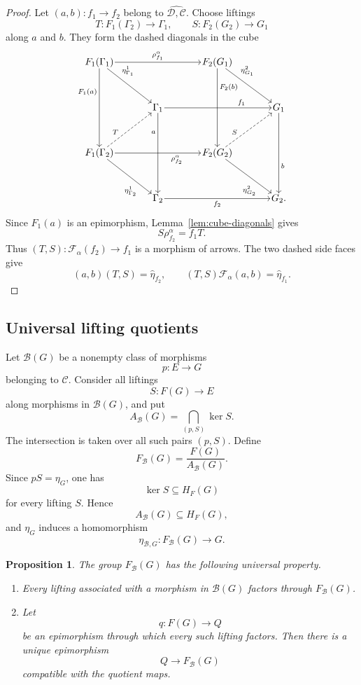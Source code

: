 \documentclass[10pt]{amsart}
\newtheorem{proposition}[theorem]{Proposition}
\renewcommand{\*}{\cdot {\dots} \cdot}
\newcommand{\?}[1]{\overset{?}{#1}}
\numberwithin{equation}{section}
\begin{document}
\begin{proof}
Let $(a,b)\colon f_1\to f_2$ belong to
$\widehat{\mathcal D,\mathcal C}$. Choose liftings
\[
T\colon F_1(\Gamma_2)\longrightarrow\Gamma_1,
\qquad
S\colon F_2(G_2)\longrightarrow G_1
\]
along $a$ and $b$. They form the dashed diagonals in the cube
\[
\begin{tikzcd}[
  row sep=3.5em,
  column sep=3.8em,
  cells={nodes={inner sep=1pt}}
]
F_1(\Gamma_1)
  \arrow[rr,"\rho_{f_1}^\alpha"]
  \arrow[dd,"F_1(a)"' {pos=0.30}]
  \arrow[dr,"\eta^1_{\Gamma_1}" {pos=0.28}]
&&
F_2(G_1)
  \arrow[dd,"F_2(b)" {pos=0.24}]
  \arrow[dr,"\eta^2_{G_1}" {pos=0.28}]
&
\\
&
\Gamma_1
  \arrow[rr,"f_1" {pos=0.72}]
  \arrow[dd,"a"' {pos=0.24}]
&&
G_1
  \arrow[dd,"b" {pos=0.66}]
\\
F_1(\Gamma_2)
  \arrow[rr,"\rho_{f_2}^\alpha"' {pos=0.72}]
  \arrow[dr,"\eta^1_{\Gamma_2}"' {pos=0.72}]
  \arrow[ur,dashed,"T" {pos=0.30}]
&&
F_2(G_2)
  \arrow[dr,"\eta^2_{G_2}"' {pos=0.72}]
  \arrow[ur,dashed,"S" {pos=0.30}]
&
\\
&
\Gamma_2
  \arrow[rr,"f_2"']
&&
G_2 .
\end{tikzcd}
\]
Since $F_1(a)$ is an epimorphism,
Lemma~\ref{lem:cube-diagonals} gives
\[
S\rho_{f_2}^\alpha=f_1T.
\]
Thus $(T,S)\colon\mathscr F_\alpha(f_2)\to f_1$ is a morphism of
arrows. The two dashed side faces give
\[
(a,b)(T,S)=\widehat\eta_{f_2},
\qquad
(T,S)\mathscr F_\alpha(a,b)=\widehat\eta_{f_1}.
\]
\end{proof}

\subsection{Universal lifting quotients}

Let $\mathcal B(G)$ be a nonempty class of morphisms
\[
p\colon E\longrightarrow G
\]
belonging to $\mathcal C$. Consider all liftings
\[
S\colon F(G)\longrightarrow E
\]
along morphisms in $\mathcal B(G)$, and put
\[
A_{\mathcal B}(G)=\bigcap_{(p,S)}\ker S.
\]
The intersection is taken over all such pairs $(p,S)$. Define
\[
F_{\mathcal B}(G)=\frac{F(G)}{A_{\mathcal B}(G)}.
\]
Since $pS=\eta_G$, one has
\[
\ker S\subseteq H_F(G)
\]
for every lifting $S$. Hence
\[
A_{\mathcal B}(G)\subseteq H_F(G),
\]
and $\eta_G$ induces a homomorphism
\[
\eta_{\mathcal B,G}\colon F_{\mathcal B}(G)\longrightarrow G.
\]

\begin{proposition}\label{prop:universal-lifting-quotient}
The group $F_{\mathcal B}(G)$ has the following universal
property.
\begin{enumerate}
\item Every lifting associated with a morphism in
$\mathcal B(G)$ factors through $F_{\mathcal B}(G)$.

\item Let
\[
q\colon F(G)\longrightarrow Q
\]
be an epimorphism through which every such lifting factors. Then
there is a unique epimorphism
\[
Q\longrightarrow F_{\mathcal B}(G)
\]
compatible with the quotient maps.
\end{enumerate}
\end{proposition}
\end{document}
